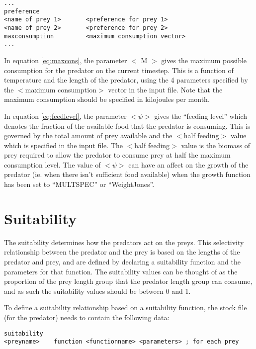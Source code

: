 \documentclass[]{book}
\begin{document}
\begin{verbatim}
...
preference
<name of prey 1>       <preference for prey 1>
<name of prey 2>       <preference for prey 2>
maxconsumption         <maximum consumption vector>
...
\end{verbatim}

In equation \eqref{eq:maxcons}, the parameter \(<\) M \(>\) gives the maximum
possible consumption for the predator on the current timestep. This is a
function of temperature and the length of the predator, using the 4
parameters specified by the \(<\)maximum consumption\(>\) vector in the
input file. Note that the maximum consumption should be specified in
kilojoules per month.

In equation \eqref{eq:feedlevel}, the parameter \(<\psi>\) gives the ``feeding
level'' which denotes the fraction of the available food that the
predator is consuming. This is governed by the total amount of prey
available and the \(<\)half feeding\(>\) value which is specified in the
input file. The \(<\)half feeding\(>\) value is the biomass of prey required
to allow the predator to consume prey at half the maximum consumption
level. The value of \(<\psi>\) can have an affect on the growth of the
predator (ie. when there isn't sufficient food available) when the
growth function has been set to ``MULTSPEC'' or ``WeightJones''.

\hypertarget{sec:suitability}{%
\section{Suitability}\label{sec:suitability}}

The suitability determines how the predators act on the preys. This
selectivity relationship between the predator and the prey is based on
the lengths of the predator and prey, and are defined by declaring a
suitability function and the parameters for that function. The
suitability values can be thought of as the proportion of the prey
length group that the predator length group can consume, and as such the
suitability values should be between 0 and 1.

To define a suitability relationship based on a suitability function,
the stock file (for the predator) needs to contain the following data:

\begin{verbatim}
suitability
<preyname>    function <functionname> <parameters> ; for each prey
\end{verbatim}
\end{document}
